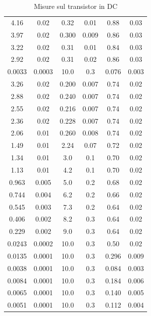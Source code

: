 \documentclass[10pt,a4paper]{article}
\begin{document}
\begin{table}[!htb]\centering
\begin{tabular}{|c|c|c|c|c|c|}

\hline
4.16 & 0.02 & 0.32 & 0.01 & 0.88 & 0.03\\
3.97 & 0.02 & 0.300 & 0.009 & 0.86 & 0.03\\
3.22 & 0.02 & 0.31 & 0.01 & 0.84 & 0.03\\
2.92 & 0.02 & 0.31 & 0.02 & 0.86 & 0.03\\
0.0033 & 0.0003 & 10.0 & 0.3 & 0.076 & 0.003\\
3.26 & 0.02 & 0.200 & 0.007 & 0.74 & 0.02\\
2.88 & 0.02 & 0.240 & 0.007 & 0.74 & 0.02\\
2.55 & 0.02 & 0.216 & 0.007 & 0.74 & 0.02\\
2.36 & 0.02 & 0.228 & 0.007 & 0.74 & 0.02\\
2.06 & 0.01 & 0.260 & 0.008 & 0.74 & 0.02\\
1.49 & 0.01 & 2.24 & 0.07 & 0.72 & 0.02\\
1.34 & 0.01 & 3.0 & 0.1 & 0.70 & 0.02\\
1.13 & 0.01 & 4.2 & 0.1 & 0.70 & 0.02\\
0.963 & 0.005 & 5.0 & 0.2 & 0.68 & 0.02\\
0.744 & 0.004 & 6.2 & 0.2 & 0.66 & 0.02\\
0.545 & 0.003 & 7.3 & 0.2 & 0.64 & 0.02\\
0.406 & 0.002 & 8.2 & 0.3 & 0.64 & 0.02\\
0.229 & 0.002 & 9.0 & 0.3 & 0.64 & 0.02\\
0.0243 & 0.0002 & 10.0 & 0.3 & 0.50 & 0.02\\
0.0135 & 0.0001 & 10.0 & 0.3 & 0.296 & 0.009\\
0.0038 & 0.0001 & 10.0 & 0.3 & 0.084 & 0.003\\
0.0084 & 0.0001 & 10.0 & 0.3 & 0.184 & 0.006\\
0.0065 & 0.0001 & 10.0 & 0.3 & 0.140 & 0.005\\
0.0051 & 0.0001 & 10.0 & 0.3 & 0.112 & 0.004\\
\hline

\end{tabular}
\caption{Misure sul transistor in DC} \label{misureDC}
\end{table}
\end{document}
